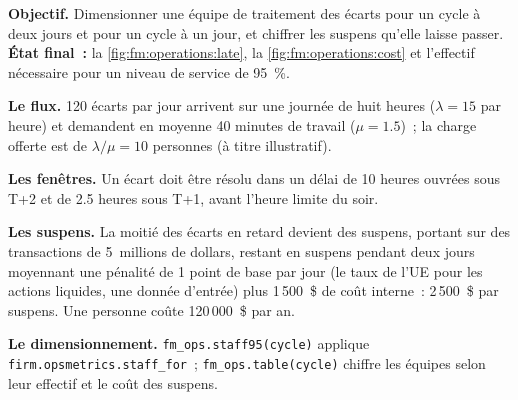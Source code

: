\begin{tutorial}
\textbf{Objectif.} Dimensionner une équipe de traitement des écarts pour un cycle à deux jours et pour un cycle à un jour, et chiffrer les suspens qu'elle laisse passer. \textbf{État final~:}
la \cref{fig:fm:operations:late}, la \cref{fig:fm:operations:cost} et l'effectif nécessaire pour un niveau de service de 95~\%.
\begin{tutsteps}
\item \textbf{Le flux.} 120 écarts par jour arrivent sur une journée de huit heures ($\lambda=15$ par heure) et demandent en moyenne 40 minutes de travail ($\mu=1.5$)~;
la charge offerte est de $\lambda/\mu=10$ personnes (à titre illustratif).
\item \textbf{Les fenêtres.} Un écart doit être résolu dans un délai de 10 heures ouvrées sous T+2 et de 2.5 heures sous T+1, avant l'heure limite du soir.
\item \textbf{Les suspens.} La moitié des écarts en retard devient des suspens, portant sur des transactions de 5~millions de dollars, restant en suspens pendant deux jours moyennant une pénalité de 1 point de base par jour
(le taux de l'UE pour les actions liquides, une donnée d'entrée) plus 1\,500~\$ de coût interne~: 2\,500~\$ par suspens. Une personne coûte 120\,000~\$ par an.
\item \textbf{Le dimensionnement.} \texttt{fm\_ops.staff95(cycle)} applique \texttt{firm.opsmetrics.staff\_for}~; \texttt{fm\_ops.table(cycle)} chiffre
les équipes selon leur effectif et le coût des suspens.
\end{tutsteps}
\end{tutorial}

